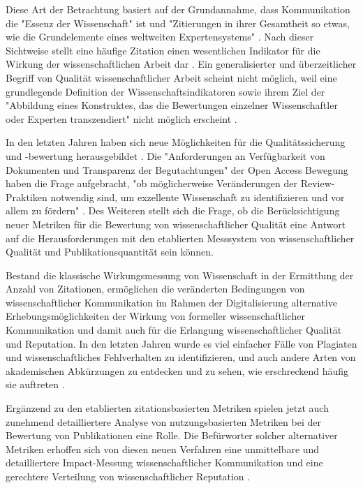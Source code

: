 Diese Art der Betrachtung basiert auf der Grundannahme, dass Kommunikation die "Essenz der Wissenschaft"\cite{bonitz_1998_matthaus} ist und "Zitierungen in ihrer Gesamtheit so etwas, wie die Grundelemente eines weltweiten Expertensystems" \cite{bonitz_1990_sci}. Nach dieser Sichtweise stellt eine häufige Zitation einen wesentlichen Indikator für die Wirkung der wissenschaftlichen Arbeit dar \cite{hamilton_1990_publishing}. Ein generalisierter und überzeitlicher Begriff von Qualität wissenschaftlicher Arbeit scheint nicht möglich, weil eine grundlegende Definition der Wissenschaftsindikatoren sowie ihrem Ziel der "Abbildung eines Konstruktes, das die Bewertungen einzelner Wissenschaftler oder Experten transzendiert" nicht möglich erscheint \cite{Hornbostel_1997}.

In den letzten Jahren haben sich neue Möglichkeiten für die Qualitätssicherung und -bewertung herausgebildet \cite{rekdal_2014_academic}. Die "Anforderungen an Verfügbarkeit von Dokumenten und Transparenz der Begutachtungen" der Open Access Bewegung haben die Frage aufgebracht, "ob möglicherweise Veränderungen der Review-Praktiken notwendig sind, um exzellente Wissenschaft zu identifizieren und vor allem zu fördern" \cite{suchen_Hornbostel_2006}. Des Weiteren stellt sich die Frage, ob die Berücksichtigung neuer Metriken für die Bewertung von wissenschaftlicher Qualität eine Antwort auf die Herausforderungen mit den etablierten Messsystem von wissenschaftlicher Qualität und Publikationsquantität sein können.

Bestand die klassische Wirkungsmessung von Wissenschaft in der Ermittlung der Anzahl von Zitationen, ermöglichen die veränderten Bedingungen von wissenschaftlicher Kommunikation im Rahmen der Digitalisierung alternative Erhebungsmöglichkeiten der Wirkung von formeller wissenschaftlicher Kommunikation und damit auch für die Erlangung wissenschaftlicher Qualität und Reputation. In den letzten Jahren wurde es viel einfacher Fälle von Plagiaten und wissenschaftliches Fehlverhalten zu identifizieren, und auch andere Arten von akademischen Abkürzungen zu entdecken und zu sehen, wie erschreckend häufig sie auftreten \cite{rekdal_2014_academic}.

Ergänzend zu den etablierten zitationsbasierten Metriken spielen jetzt auch zunehmend detailliertere Analyse von nutzungsbasierten Metriken bei der Bewertung von Publikationen eine Rolle. Die Befürworter solcher alternativer Metriken erhoffen sich von diesen neuen Verfahren eine unmittelbare und detailliertere Impact-Messung wissenschaftlicher Kommunikation und eine gerechtere Verteilung von wissenschaftlicher Reputation \cite{suchen_ggf_herb}.

